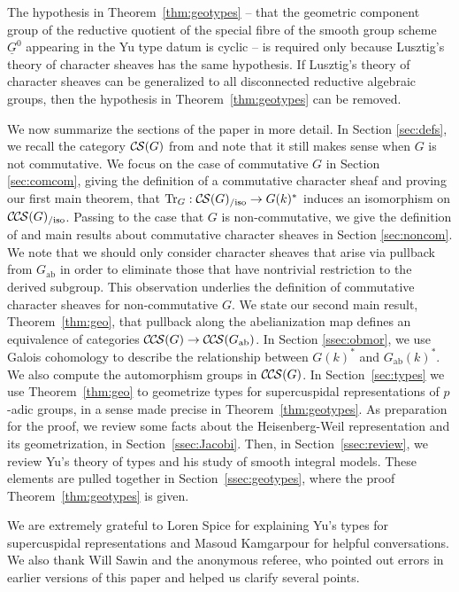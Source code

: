 \documentclass[10pt]{amsart}
\theoremstyle{plain}
\theoremstyle{definition}
\newcommand{\ab}{_{\operatorname{ab}}}
\DeclareMathOperator{\Tr}{Tr}
\newcommand{\TrFrob}[1]{\Tr_{#1}}
\newcommand{\CS}{{\mathcal{C\hskip-0.8pt S}}}
\newcommand{\CCS}{{\mathcal{C\hskip-.8pt C\hskip-0.8pt S}}}
\newcommand{\CSiso}[1]{\CS(#1)_{/\text{iso}}}
\newcommand{\CCSiso}[1]{\CCS(#1)_{/\text{iso}}}
\begin{document}
The hypothesis in Theorem~\ref{thm:geotypes} -- that the geometric component group of the reductive quotient of the special fibre of the smooth group scheme $\underline{G}^0$ appearing in the Yu type datum is cyclic --  is required only because Lusztig's theory of character sheaves has the same hypothesis.
If Lusztig's theory of character sheaves can be generalized to all disconnected reductive algebraic groups, then the hypothesis in Theorem~\ref{thm:geotypes} can be removed.
\bigskip

We now summarize the sections of the paper in more detail.
In Section \ref{sec:defs}, we recall the category $\CS(G)$ from \cite{cunningham-roe:13a} and note that it still makes sense when $G$ is not commutative.  
We focus on the case of commutative $G$ in Section \ref{sec:comcom},
giving the definition of a commutative character sheaf and proving our first main theorem, that
$\TrFrob{G} : \CSiso{G} \to G(k)^*$ induces an isomorphism on $\CCSiso{G}$.
Passing to the case that $G$ is non-commutative, we give the definition of and main results about commutative character sheaves in Section \ref{sec:noncom}.  
We note that we should only consider character sheaves that arise via pullback from $G\ab$ in order to eliminate those that have nontrivial restriction to the derived subgroup.  
This observation underlies the definition of commutative character sheaves for non-commutative $G$.  
We state our second main result, Theorem~\ref{thm:geo}, that pullback along the abelianization map defines an equivalence of categories $\CCS(G) \to \CCS(G\ab)$.
In Section \ref{ssec:obmor}, we use Galois cohomology to describe the relationship between $G(k)^*$ and $G\ab(k)^*$.  
We also compute the automorphism groups in $\CCS(G)$.
In Section~\ref{sec:types} we use Theorem~\ref{thm:geo} to geometrize types for supercuspidal representations of $p$-adic groups, in a sense made precise in Theorem~\ref{thm:geotypes}.
As preparation for the proof, we review some facts about the Heisenberg-Weil representation and its geometrization, in Section~\ref{ssec:Jacobi}.
Then, in Section~\ref{ssec:review}, we review Yu's theory of types and his study of smooth integral models.  
These elements are pulled together in Section~\ref{ssec:geotypes}, where the proof Theorem~\ref{thm:geotypes} is given.



\bigskip

We are extremely grateful to Loren Spice for explaining Yu's types for supercuspidal representations and Masoud Kamgarpour for helpful conversations.
We also thank Will Sawin and the anonymous referee, who pointed out errors in earlier versions of this paper and helped us clarify several points.
\end{document}
